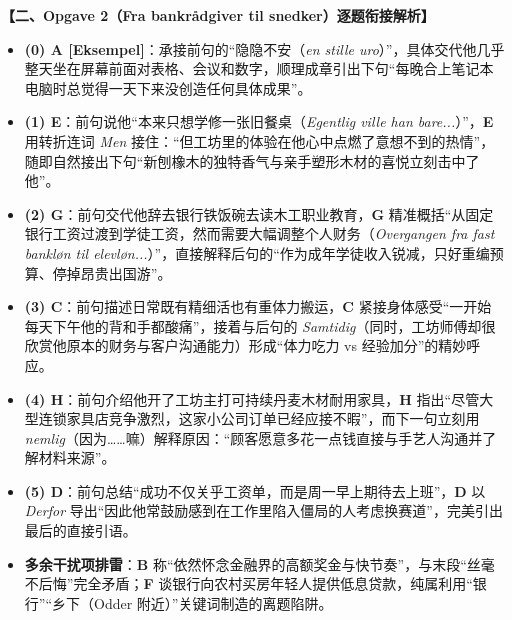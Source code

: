 \begin{answerbox}
\textbf{\color{NCDNavy}【二、Opgave 2（Fra bankrådgiver til snedker）逐题衔接解析】}
\begin{itemize}
  \item \textbf{(0) A [Eksempel]}：承接前句的“隐隐不安（\textit{en stille uro}）”，具体交代他几乎整天坐在屏幕前面对表格、会议和数字，顺理成章引出下句“每晚合上笔记本电脑时总觉得一天下来没创造任何具体成果”。
  \item \textbf{(1) E}：前句说他“本来只想学修一张旧餐桌（\textit{Egentlig ville han bare...}）”，\textbf{E} 用转折连词 \textit{Men} 接住：“但工坊里的体验在他心中点燃了意想不到的热情”，随即自然接出下句“新刨橡木的独特香气与亲手塑形木材的喜悦立刻击中了他”。
  \item \textbf{(2) G}：前句交代他辞去银行铁饭碗去读木工职业教育，\textbf{G} 精准概括“从固定银行工资过渡到学徒工资，然而需要大幅调整个人财务（\textit{Overgangen fra fast bankløn til elevløn...}）”，直接解释后句的“作为成年学徒收入锐减，只好重编预算、停掉昂贵出国游”。
  \item \textbf{(3) C}：前句描述日常既有精细活也有重体力搬运，\textbf{C} 紧接身体感受“一开始每天下午他的背和手都酸痛”，接着与后句的 \textit{Samtidig}（同时，工坊师傅却很欣赏他原本的财务与客户沟通能力）形成“体力吃力 vs 经验加分”的精妙呼应。
  \item \textbf{(4) H}：前句介绍他开了工坊主打可持续丹麦木材耐用家具，\textbf{H} 指出“尽管大型连锁家具店竞争激烈，这家小公司订单已经应接不暇”，而下一句立刻用 \textit{nemlig}（因为……嘛）解释原因：“顾客愿意多花一点钱直接与手艺人沟通并了解材料来源”。
  \item \textbf{(5) D}：前句总结“成功不仅关乎工资单，而是周一早上期待去上班”，\textbf{D} 以 \textit{Derfor} 导出“因此他常鼓励感到在工作里陷入僵局的人考虑换赛道”，完美引出最后的直接引语。
  \item \textbf{多余干扰项排雷}：\textbf{B} 称“依然怀念金融界的高额奖金与快节奏”，与末段“丝毫不后悔”完全矛盾；\textbf{F} 谈银行向农村买房年轻人提供低息贷款，纯属利用“银行”“乡下（Odder 附近）”关键词制造的离题陷阱。
\end{itemize}
\end{answerbox}

